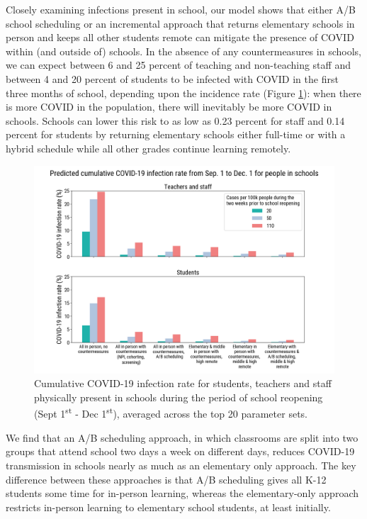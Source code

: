 \documentclass[preprint,12pt]{elsarticle}
\begin{document}
Closely examining infections present in school, our model shows that either A/B school scheduling or an incremental approach that returns elementary schools in person and keeps all other students remote can mitigate the presence of COVID within (and outside of) schools. In the absence of any countermeasures in schools, we can expect between 6 and 25 percent of teaching and non-teaching staff and between 4 and 20 percent of students to be infected with COVID in the first three months of school, depending upon the incidence rate (Figure \ref{fig:attack_rate}): when there is more COVID in the population, there will inevitably be more COVID in schools. Schools can lower this risk to as low as 0.23 percent for staff and 0.14 percent for students by returning elementary schools either full-time or with a hybrid schedule while all other grades continue learning remotely.

\begin{figure}
    \centering
    \includegraphics[scale=0.2]{attack rate.png}
    \caption{Cumulative COVID-19 infection rate for students, teachers and staff physically present in schools during the period of school reopening (Sept 1\textsuperscript{st} - Dec 1\textsuperscript{st}), averaged across the top 20 parameter sets.}
    \label{fig:attack_rate}
\end{figure}

We find that an A/B scheduling approach, in which classrooms are split into two groups that attend school two days a week on different days, reduces COVID-19 transmission in schools nearly as much as an elementary only approach. The key difference between these approaches is that A/B scheduling gives all K-12 students some time for in-person learning, whereas the elementary-only approach restricts in-person learning to elementary school students, at least initially.
\end{document}
